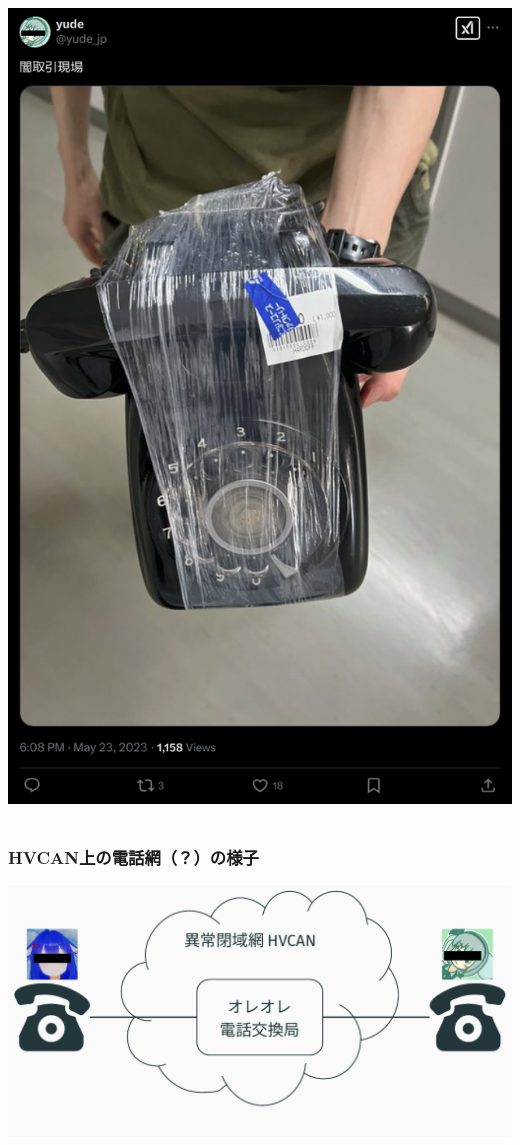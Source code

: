 \documentclass[
  lualatex,
  aspectratio=169,
  14pt
]{beamer}
\begin{document}
\begin{frame}
\begin{columns}[b]
\begin{column}{.49\textwidth}
      \includegraphics[height=.9\textheight]{./images/yami.png}
    \end{column}
  \end{columns}
  \centering
\end{frame}


\begin{frame}
  \frametitle{HVCAN上の電話網（？）の様子}

  \includegraphics[page=1,width=\linewidth]{./images/pictures.pdf}
\end{frame}
\end{document}
